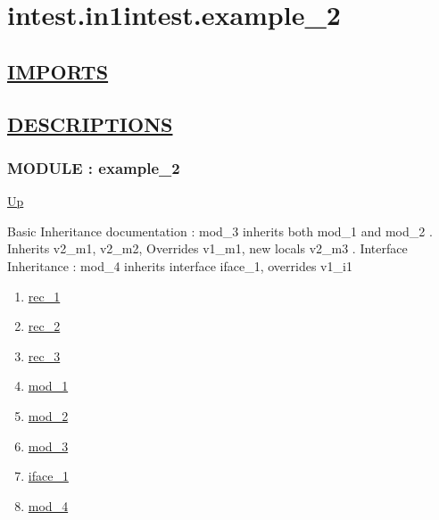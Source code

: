 \chapter*{intest.in1intest.example\_2}
\hypertarget{ecldoc:toc:intest.in1intest.example_2}{}

\section*{\underline{IMPORTS}}

\section*{\underline{DESCRIPTIONS}}
\subsection*{MODULE : example\_2}
\hypertarget{ecldoc:intest.in1intest.example_2}{}
\par
\begin{minipage}[t]{\textwidth}
\begin{flushleft}
  
\end{flushleft}
\end{minipage}
\hyperlink{ecldoc:toc:intest/in1intest}{Up} \\
\par
Basic Inheritance documentation : mod\_3 inherits both mod\_1 and mod\_2 . Inherits v2\_m1, v2\_m2, Overrides v1\_m1, new locals v2\_m3 . Interface Inheritance : mod\_4 inherits interface iface\_1, overrides v1\_i1 \\
\par
\begin{enumerate}
\item \hyperlink{ecldoc:intest.in1intest.example_2.rec_1}{rec\_1}
\item \hyperlink{ecldoc:intest.in1intest.example_2.rec_2}{rec\_2}
\item \hyperlink{ecldoc:intest.in1intest.example_2.rec_3}{rec\_3}
\item \hyperlink{ecldoc:intest.in1intest.example_2.mod_1}{mod\_1}
\item \hyperlink{ecldoc:intest.in1intest.example_2.mod_2}{mod\_2}
\item \hyperlink{ecldoc:intest.in1intest.example_2.mod_3}{mod\_3}
\item \hyperlink{ecldoc:intest.in1intest.example_2.iface_1}{iface\_1}
\item \hyperlink{ecldoc:intest.in1intest.example_2.mod_4}{mod\_4}
\end{enumerate}
